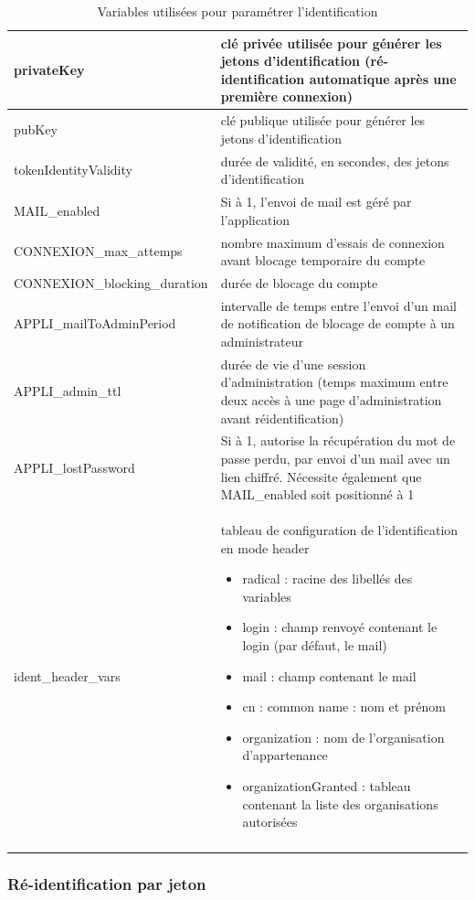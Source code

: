 \begin{longtable}{|p{6cm}|p{10cm}|}
\hline
privateKey & clé privée utilisée pour générer les jetons d'identification (ré-identification automatique après une première connexion) \\
\hline
pubKey & clé publique utilisée pour générer les jetons d'identification \\
\hline
tokenIdentityValidity & durée de validité, en secondes, des jetons d'identification\\
\hline
MAIL\_enabled & Si à 1, l'envoi de mail est géré par l'application \\
\hline
CONNEXION\_max\_attemps & nombre maximum d'essais de connexion avant blocage temporaire du compte \\
\hline
CONNEXION\_blocking\_duration & durée de blocage du compte \\
\hline
APPLI\_mailToAdminPeriod & intervalle de temps entre l'envoi d'un mail de notification de blocage de compte à un administrateur \\
\hline
APPLI\_admin\_ttl & durée de vie d'une session d'administration (temps maximum entre deux accès à une page d'administration avant réidentification) \\
\hline
APPLI\_lostPassword & Si à 1, autorise la récupération du mot de passe perdu, par envoi d'un mail avec un lien chiffré. Nécessite également que MAIL\_enabled soit positionné à 1 \\
\hline
ident\_header\_vars & tableau de configuration de l'identification en mode header
\begin{itemize}
	\item radical : racine des libellés des variables
	\item login : champ renvoyé contenant le login (par défaut, le mail)
	\item mail : champ contenant le mail
	\item cn : common name : nom et prénom
	\item organization : nom de l'organisation d'appartenance
	\item organizationGranted : tableau contenant la liste des organisations autorisées
\end{itemize}
\\
\hline

\caption{Variables utilisées pour paramétrer l'identification}
\end{longtable}

\subsubsection{Ré-identification par jeton}

